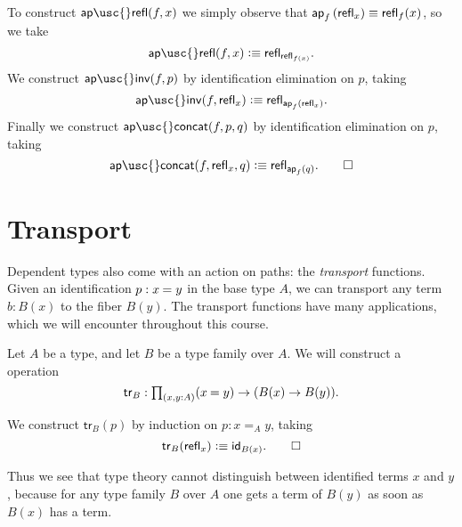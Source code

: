 \begin{constr}
To construct $\mathsf{ap\usc{}refl}(f,x)$ we simply observe that ${\ap{f}{\refl{x}}}\jdeq {\refl{f}(x)}$, so we take
\begin{equation*}
\mathsf{ap\usc{}refl}(f,x)\defeq\refl{\refl{f(x)}}.
\end{equation*}
We construct $\mathsf{ap\usc{}inv}(f,p)$ by identification elimination on $p$, taking
\begin{equation*}
\mathsf{ap\usc{}inv}(f,\refl{x}) \defeq \refl{\ap{f}{\refl{x}}}.
\end{equation*}
Finally we construct $\mathsf{ap\usc{}concat}(f,p,q)$ by identification elimination on $p$, taking
\begin{equation*}
\mathsf{ap\usc{}concat}(f,\refl{x},q)  \defeq \refl{\ap{f}{q}}.\qedhere
\end{equation*}
\end{constr}

\section{Transport}

Dependent types also come with an action on paths: the \emph{transport} functions.
Given an identification $p:\id{x}{y}$ in the base type $A$, we can transport any term $b:B(x)$ to the fiber $B(y)$.
The transport functions have many applications, which we will encounter throughout this course.

\begin{defn}
Let $A$ be a type, and let $B$ be a type family over $A$.
We will construct a  operation
\begin{equation*}
\mathsf{tr}_B:\prd*{x,y:A} (\id{x}{y})\to (B(x)\to B(y)).
\end{equation*}
\end{defn}

\begin{constr}
We construct $\mathsf{tr}_B(p)$ by induction on $p:x=_A y$, taking
\begin{equation*}
\mathsf{tr}_B(\refl{x}) \defeq \idfunc[B(x)].\qedhere
\end{equation*}
\end{constr}

Thus we see that type theory cannot distinguish between identified terms $x$ and $y$, because for any type family $B$ over $A$ one gets a term of $B(y)$ as soon as $B(x)$ has a term.

